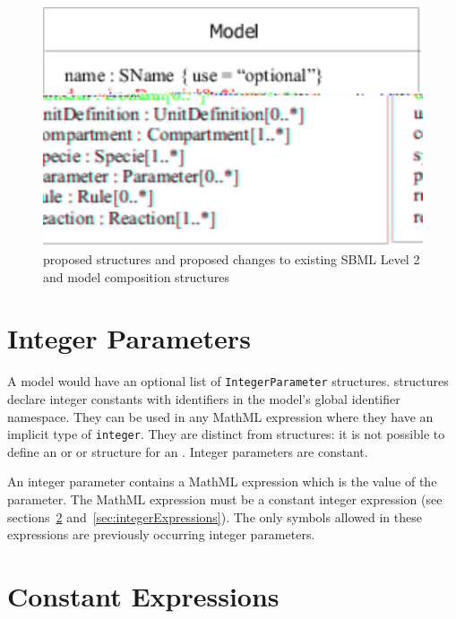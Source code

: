 \documentclass{cekarticle}
\begin{document}
\begin{figure}[h]
  \vspace*{8pt}
  \centering
  \includegraphics[scale = 0.7]{model}
  \caption{proposed structures and proposed changes to existing SBML Level 2 and model composition structures}
  \label{fig:model}
\end{figure}

\section{Integer Parameters}
\label{sec:integerParameters}

A model would have an optional list of
\texttt{IntegerParameter} structures.
 structures declare integer constants with identifiers in the model's global identifier namespace.
They can be used in any MathML expression where they have an implicit type of \texttt{integer}.
They are distinct from  structures: it is not possible to define an  or 
or  structure for an .  Integer parameters are constant.

An integer parameter contains a MathML expression which is the value of the parameter.  The MathML expression must be a constant integer
expression (see sections~\ref{sec:constantExpressions} and~\ref{sec:integerExpressions}).  The only symbols allowed
in these expressions are previously occurring integer parameters.

\section{Constant Expressions}
\label{sec:constantExpressions}
\end{document}

